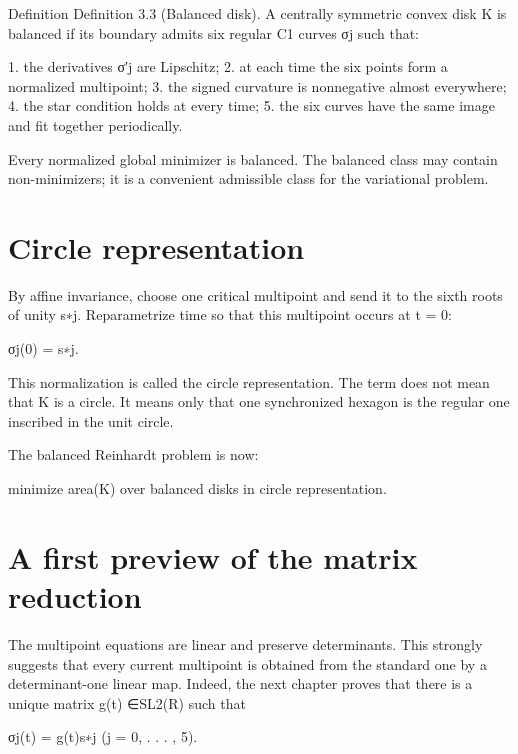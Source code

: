 \begin{statementbox}{Definition}
Definition 3.3 (Balanced disk). A centrally symmetric convex disk K is balanced if its boundary admits six regular C1 curves σj such that:
\end{statementbox}

1. the derivatives σ′j are Lipschitz; 2. at each time the six points form a normalized multipoint; 3. the signed curvature is nonnegative almost everywhere; 4. the star condition holds at every time; 5. the six curves have the same image and fit together periodically.


Every normalized global minimizer is balanced. The balanced class may contain non-minimizers; it is a convenient admissible class for the variational problem.


\section{Circle representation}

By affine invariance, choose one critical multipoint and send it to the sixth roots of unity s∗j. Reparametrize time so that this multipoint occurs at t = 0:


\begin{displaytext}
σj(0) = s∗j.
\end{displaytext}

This normalization is called the circle representation. The term does not mean that K is a circle. It means only that one synchronized hexagon is the regular one inscribed in the unit circle.


The balanced Reinhardt problem is now:


minimize area(K) over balanced disks in circle representation.


\section{A first preview of the matrix reduction}

The multipoint equations are linear and preserve determinants. This strongly suggests that every current multipoint is obtained from the standard one by a determinant-one linear map. Indeed, the next chapter proves that there is a unique matrix g(t) ∈SL2(R) such that


\begin{displaytext}
σj(t) = g(t)s∗j (j = 0, . . . , 5).
\end{displaytext}

